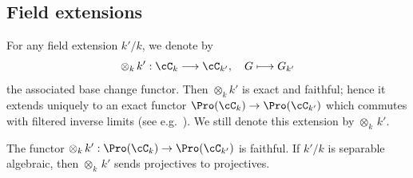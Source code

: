 \subsection{Field extensions}\label{subsec:field}


For any field extension $k'/k$, we denote by
\[
\otimes_k \, k' : \cC_k \longrightarrow \cC_{k'},
\quad G \longmapsto G_{k'}
\]
the associated base change functor. Then $\otimes_k k'$ is exact and faithful; hence it extends uniquely to an exact functor $\Pro(\cC_k) \to \Pro(\cC_{k'})$ which commutes with filtered inverse limits (see e.g.~\cite[Prop.~6.1.9, Cor.~8.6.8]{KS}). We still denote this extension by $\otimes_k \, k'$.

\begin{lemm}\label{lem:change}
The functor $\otimes_k \, k' : \Pro(\cC_k) \to \Pro(\cC_{k'})$ is faithful. If $k'/k$ is separable algebraic, then $\otimes_k \, k'$ sends projectives to projectives.
\end{lemm}

